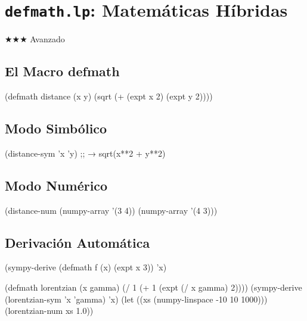 \chapter{\texttt{defmath.lp}: Matemáticas Híbridas}
\label{chap:defmath}
{\huge$\bigstar$}{\huge$\bigstar$}{\huge$\bigstar$} Avanzado

\section{El Macro defmath}
\begin{lispcode}
(defmath distance (x y) (sqrt (+ (expt x 2) (expt y 2))))
\end{lispcode}

\section{Modo Simbólico}
\begin{lispcode}
(distance-sym 'x 'y)  ;; → sqrt(x**2 + y**2)
\end{lispcode}

\section{Modo Numérico}
\begin{lispcode}
(distance-num (numpy-array '(3 4)) (numpy-array '(4 3)))
\end{lispcode}

\section{Derivación Automática}
\begin{lispcode}
(sympy-derive (defmath f (x) (expt x 3)) 'x)
\end{lispcode}

\begin{examplebox}[title=Función Lorentziana híbrida]
\begin{lispcode}
(defmath lorentzian (x gamma) (/ 1 (+ 1 (expt (/ x gamma) 2))))
(sympy-derive (lorentzian-sym 'x 'gamma) 'x)
(let ((xs (numpy-linspace -10 10 1000))) (lorentzian-num xs 1.0))
\end{lispcode}
\end{examplebox}

